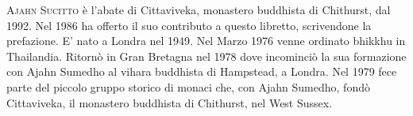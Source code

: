 {{\scshape Ajahn Sucitto} è l'abate di Cittaviveka, monastero buddhista di Chithurst, dal 1992. Nel 1986 ha offerto il suo contributo a questo libretto, scrivendone la prefazione. E' nato a Londra nel 1949. Nel Marzo 1976 venne ordinato bhikkhu in Thailandia. Ritornò in Gran Bretagna nel 1978 dove incominciò la sua formazione con Ajahn Sumedho al vihara buddhista di Hampstead, a Londra. Nel 1979 fece parte del piccolo gruppo storico di monaci che, con Ajahn Sumedho, fondò Cittaviveka, il monastero buddhista di Chithurst, nel West Sussex.

}

